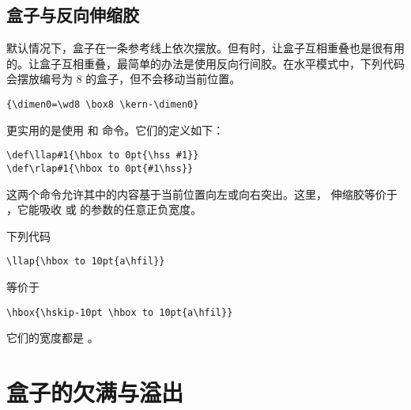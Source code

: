 \documentclass{book}
\begin{document}
\subsection{盒子与反向伸缩胶}

默认情况下，盒子在一条参考线上依次摆放。但有时，让盒子互相重叠也是很有用的。让盒子互相重叠，最简单的办法是使用反向行间胶。在水平模式中，下列代码会摆放编号为 8 的盒子，但不会移动当前位置。
\begin{verbatim}
{\dimen0=\wd8 \box8 \kern-\dimen0}
\end{verbatim}

更实用的是使用  和 \label{rlap} 命令。它们的定义如下：
\begin{verbatim}
\def\llap#1{\hbox to 0pt{\hss #1}}
\def\rlap#1{\hbox to 0pt{#1\hss}}
\end{verbatim}
这两个命令允许其中的内容基于当前位置向左或向右突出。这里， 伸缩胶等价于 ，它能吸收  或  的参数的任意正负宽度。

\begin{example}
下列代码
\begin{verbatim}
\llap{\hbox to 10pt{a\hfil}}
\end{verbatim}
等价于
\begin{verbatim}
\hbox{\hskip-10pt \hbox to 10pt{a\hfil}}
\end{verbatim}
它们的宽度都是 \n{0pt}。
\end{example}

\section{盒子的欠满与溢出}
\label{over/underfull}
\end{document}
